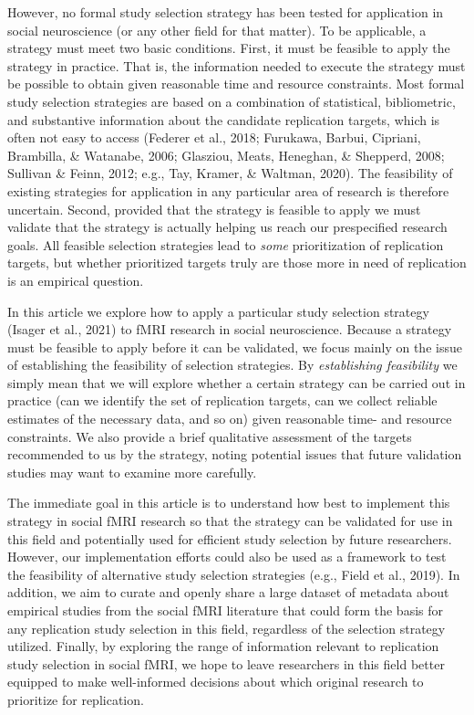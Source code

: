 \documentclass[
  english,
  man,floatsintext]{apa6}
\begin{document}
However, no formal study selection strategy has been tested for application in social neuroscience (or any other field for that matter). To be applicable, a strategy must meet two basic conditions. First, it must be feasible to apply the strategy in practice. That is, the information needed to execute the strategy must be possible to obtain given reasonable time and resource constraints. Most formal study selection strategies are based on a combination of statistical, bibliometric, and substantive information about the candidate replication targets, which is often not easy to access (Federer et al., 2018; Furukawa, Barbui, Cipriani, Brambilla, \& Watanabe, 2006; Glasziou, Meats, Heneghan, \& Shepperd, 2008; Sullivan \& Feinn, 2012; e.g., Tay, Kramer, \& Waltman, 2020). The feasibility of existing strategies for application in any particular area of research is therefore uncertain. Second, provided that the strategy is feasible to apply we must validate that the strategy is actually helping us reach our prespecified research goals. All feasible selection strategies lead to \emph{some} prioritization of replication targets, but whether prioritized targets truly are those more in need of replication is an empirical question.

In this article we explore how to apply a particular study selection strategy (Isager et al., 2021) to fMRI research in social neuroscience. Because a strategy must be feasible to apply before it can be validated, we focus mainly on the issue of establishing the feasibility of selection strategies. By \emph{establishing feasibility} we simply mean that we will explore whether a certain strategy can be carried out in practice (can we identify the set of replication targets, can we collect reliable estimates of the necessary data, and so on) given reasonable time- and resource constraints. We also provide a brief qualitative assessment of the targets recommended to us by the strategy, noting potential issues that future validation studies may want to examine more carefully.

The immediate goal in this article is to understand how best to implement this strategy in social fMRI research so that the strategy can be validated for use in this field and potentially used for efficient study selection by future researchers. However, our implementation efforts could also be used as a framework to test the feasibility of alternative study selection strategies (e.g., Field et al., 2019). In addition, we aim to curate and openly share a large dataset of metadata about empirical studies from the social fMRI literature that could form the basis for any replication study selection in this field, regardless of the selection strategy utilized. Finally, by exploring the range of information relevant to replication study selection in social fMRI, we hope to leave researchers in this field better equipped to make well-informed decisions about which original research to prioritize for replication.
\end{document}

